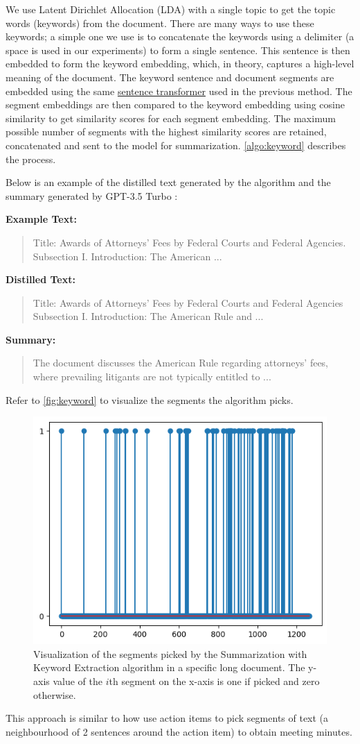 We use Latent Dirichlet Allocation (LDA) \cite{blei2003latent} with a single topic to get the topic words (keywords) from the document.
There are many ways to use these keywords; a simple one we use is to concatenate the keywords using a delimiter (a space is used in our experiments) to form a single sentence.
This sentence is then embedded to form the keyword embedding, which, in theory, captures a high-level meaning of the document.
The keyword sentence and document segments are embedded using the same \href{https://huggingface.co/sentence-transformers/all-MiniLM-L6-v2}{sentence transformer} used in the previous method.
The segment embeddings are then compared to the keyword embedding using cosine similarity to get similarity scores for each segment embedding.
The maximum possible number of segments with the highest similarity scores are retained, concatenated and sent to the model for summarization.
\autoref{algo:keyword} describes the process.

Below is an example of the distilled text generated by the algorithm and the summary generated by GPT-3.5 Turbo \cite{brown2020language}:

\noindent \textbf{Example Text:}
\begin{quote}
  Title: Awards of Attorneys' Fees by Federal Courts and Federal Agencies. Subsection I. Introduction: The American ...
\end{quote}

\noindent \textbf{Distilled Text:}
\begin{quote}
  Title: Awards of Attorneys' Fees by Federal Courts and Federal Agencies Subsection I. Introduction: The American Rule and ...
\end{quote}

\noindent \textbf{Summary:}
\begin{quote}
  The document discusses the American Rule regarding attorneys' fees, where prevailing litigants are not typically entitled to ...
\end{quote}

Refer to \autoref{fig:keyword} to visualize the segments the algorithm picks.

\begin{figure}
  \centering
  \includegraphics*[width=.45\textwidth]{images/keyword.png}
  \caption{
    Visualization of the segments picked by the Summarization with Keyword Extraction algorithm in a specific long document.
    The y-axis value of the $i$th segment on the x-axis is one if picked and zero otherwise.
  }
  \label{fig:keyword}
\end{figure}

This approach is similar to how \citet{golia2024action} use action items to pick segments of text (a neighbourhood of 2 sentences around the action item) to obtain meeting minutes.
